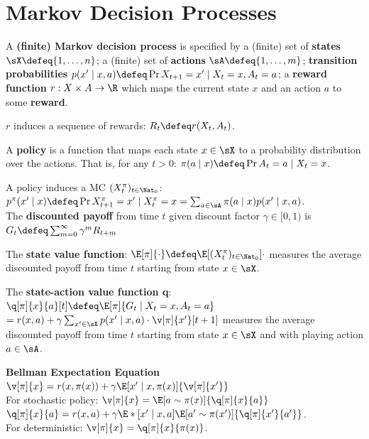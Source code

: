 \section{Markov Decision Processes}
\begin{framed}
    A \textbf{(finite) Markov decision process} is specified by a (finite) set of \textbf{states} $\sX \defeq \{1, \dots, n\}$; a (finite) set of \textbf{actions} $\sA \defeq \{1, \dots, m\}$; \textbf{transition probabilities} ${p(x' \mid x, a) \defeq \Pr{X_{t+1} = x' \mid X_t = x, A_t = a}}$; a \textbf{reward function} $r : X \times A \to \R$ which maps the current state $x$ and an action $a$ to some \textbf{reward}.
\end{framed}
$r$ induces a sequence of rewards: $R_t \defeq r(X_t, A_t)$.
\begin{framed}
    A \textbf{policy} is a function that maps each state $x \in \sX$ to a probability distribution over the actions. That is, for any $t > 0$: $\pi(a \mid x) \defeq \Pr{A_t = a \mid X_t = x}$.
\end{framed}
A policy induces a MC $(X_t^\pi)_{t\in\Nat_0}$: $p^\pi(x' \mid x) \defeq \Pr{X_{t+1}^\pi = x' \mid X_t^\pi = x} = \sum_{a \in \sA} \pi(a \mid x) p(x' \mid x, a)$.\\
The \textbf{discounted payoff} from time $t$ given discount factor $\gamma \in [0, 1)$ is\\
 $G_t \defeq \sum_{m=0}^\infty \gamma^m R_{t+m}$
\begin{framed}
    The \textbf{state value function}: $\E[\pi]{\cdot} \defeq \E[(X_t^\pi)_{t\in\Nat_0}]{\cdot}$ measures the average discounted payoff from time $t$ starting from state $x \in \sX$.
\end{framed}
\begin{framed}
    The \textbf{state-action value function q}: \\
    $\q[\pi]{x}{a}[t] \defeq \E[\pi]{G_t \mid X_t = x, A_t = a}$ \\
    $ = r(x, a) + \gamma \sum_{x' \in \sX} p(x' \mid x, a) \cdot \v[\pi]{x'}[t+1]$ measures the average discounted payoff from time $t$ starting from state $x \in \sX$ and with playing action $a \in \sA$.
\end{framed}
\begin{framed}
    \textbf{Bellman Expectation Equation}\\
    $\v[\pi]{x} = r(x, \pi(x)) + \gamma \E[x' \mid x, \pi(x)]{\v[\pi]{x'}}$ \\
    For stochastic policy: $\v[\pi]{x} = \E[a \sim \pi(x)]{\q[\pi]{x}{a}}$ \\
    $\q[\pi]{x}{a} = r(x, a) + \gamma \E*[x' \mid x, a]{\E[a' \sim \pi(x')]{\q[\pi]{x'}{a'}}}$.\\
    For deterministic: $\v[\pi]{x} = \q[\pi]{x}{\pi(x)}$.
\end{framed}
